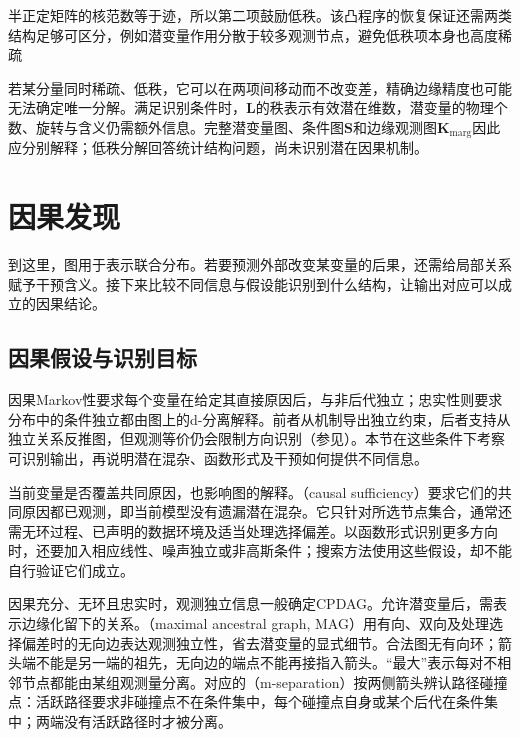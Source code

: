 半正定矩阵的核范数等于迹，所以第二项鼓励低秩。该凸程序的恢复保证还需两类结构足够可区分，例如潜变量作用分散于较多观测节点，避免低秩项本身也高度稀疏

若某分量同时稀疏、低秩，它可以在两项间移动而不改变差，精确边缘精度也可能无法确定唯一分解。满足识别条件时，$\bm{L}$的秩表示有效潜在维数，潜变量的物理个数、旋转与含义仍需额外信息。完整潜变量图、条件图$\bm{S}$和边缘观测图$\bm{K}_{\mathrm{marg}}$因此应分别解释；低秩分解回答统计结构问题，尚未识别潜在因果机制。

\section{因果发现}
\label{sec:pgm-structure-learning-causal}

到这里，图用于表示联合分布。若要预测外部改变某变量的后果，还需给局部关系赋予干预含义。接下来比较不同信息与假设能识别到什么结构，让输出对应可以成立的因果结论。

\subsection{因果假设与识别目标}
\label{sec:pgm-structure-learning-causal-assumptions}

因果Markov性要求每个变量在给定其直接原因后，与非后代独立；忠实性则要求分布中的条件独立都由图上的d-分离解释。前者从机制导出独立约束，后者支持从独立关系反推图，但观测等价仍会限制方向识别（参见）。本节在这些条件下考察可识别输出，再说明潜在混杂、函数形式及干预如何提供不同信息。

当前变量是否覆盖共同原因，也影响图的解释。（causal sufficiency）要求它们的共同原因都已观测，即当前模型没有遗漏潜在混杂。它只针对所选节点集合，通常还需无环过程、已声明的数据环境及适当处理选择偏差。以函数形式识别更多方向时，还要加入相应线性、噪声独立或非高斯条件；搜索方法使用这些假设，却不能自行验证它们成立。

因果充分、无环且忠实时，观测独立信息一般确定CPDAG。允许潜变量后，需表示边缘化留下的关系。（maximal ancestral graph, MAG）用有向、双向及处理选择偏差时的无向边表达观测独立性，省去潜变量的显式细节。合法图无有向环；箭头端不能是另一端的祖先，无向边的端点不能再接指入箭头。“最大”表示每对不相邻节点都能由某组观测量分离。对应的（m-separation）按两侧箭头辨认路径碰撞点：活跃路径要求非碰撞点不在条件集中，每个碰撞点自身或某个后代在条件集中；两端没有活跃路径时才被分离。

